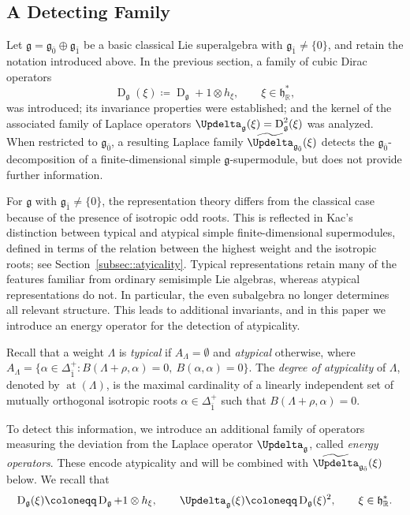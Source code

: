 \documentclass[11pt]{amsart}
\newcommand{\Dirac}{\operatorname{D}}
\def\Laplace{{\Updelta_{\gg}(\xi)}}
\def\RR{{\mathbb R}}
\def\hh{{\mathfrak h}}
\def \at{{\operatorname{at}}}
\def\even{{\mathfrak{g}_{\bar{0}}}}
\def\odd{{\mathfrak{g}_{\bar{1}}}}
\def\gg{{\mathfrak{g}}}
\theoremstyle{plain}
\theoremstyle{remark}
\theoremstyle{definition}
\numberwithin{equation}{section}
\theoremstyle{remark}
\begin{document}
\subsection{A Detecting Family}

Let $\gg=\even\oplus\odd$ be a basic classical Lie superalgebra with $\odd\neq\{0\}$, and retain the notation introduced above. In the previous section, a family of cubic Dirac operators
\begin{equation}
\Dirac_{\gg}(\xi)\coloneqq \Dirac_{\gg}+1\otimes h_{\xi},\qquad \xi\in\hh_{\RR}^{\ast},
\end{equation}
was introduced; its invariance properties were established; and the kernel of the associated family of Laplace operators $\Updelta_{\gg}(\xi)=\Dirac^2_{\gg}(\xi)$ was analyzed. When restricted to $\even$, a resulting Laplace family $\widetilde{\Updelta}_{\even}(\xi)$ detects the $\even$-decomposition of a finite-dimensional simple $\gg$-supermodule, but does not provide further information. 

For $\gg$ with $\odd \neq \{0\}$, the representation theory differs from the classical case because of the presence of isotropic odd roots. This is reflected in Kac’s distinction between typical and atypical simple finite-dimensional supermodules, defined in terms of the relation between the highest weight and the isotropic roots; see Section~\ref{subsec::atyicality}. Typical representations retain many of the features familiar from ordinary semisimple Lie algebras, whereas atypical representations do not. In particular, the even subalgebra no longer determines all relevant structure. This leads to additional invariants, and in this paper we introduce an energy operator for the detection of atypicality.

Recall that a weight $\Lambda$ is \emph{typical} if $A_{\Lambda}=\emptyset$ and \emph{atypical} otherwise, where $A_{\Lambda}=\{\alpha\in\Delta_{\bar{1}}^{+}:B(\Lambda+\rho,\alpha)=0, \ B(\alpha,\alpha)=0\}$. The \emph{degree of atypicality} of $\Lambda$, denoted by $\at(\Lambda)$, is the maximal cardinality of a linearly independent set of mutually orthogonal isotropic roots $\alpha\in\Delta_{\bar{1}}^{+}$ such that $B(\Lambda+\rho,\alpha)=0$.

To detect this information, we introduce an additional family of operators measuring the deviation from the Laplace operator $\Updelta_{\gg}$, called \emph{energy operators}. These encode atypicality and will be combined with $\widetilde{\Updelta}_{\even}(\xi)$ below. We recall that
\begin{equation}
\Dirac_{\gg}(\xi)\coloneqq \Dirac_{\gg}+1\otimes h_{\xi},\qquad
\Laplace\coloneqq \Dirac_{\gg}(\xi)^{2}, \qquad \xi \in \hh_{\RR}^{\ast}.
\end{equation}
\end{document}
